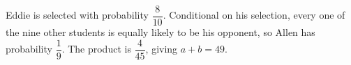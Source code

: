 Eddie is selected with probability $\dfrac{8}{10}$. Conditional on his selection, every one of the nine other students is equally likely to be his opponent, so Allen has probability $\dfrac{1}{9}$. The product is $\dfrac{4}{45}$, giving $\boxed{a+b=49}$.
